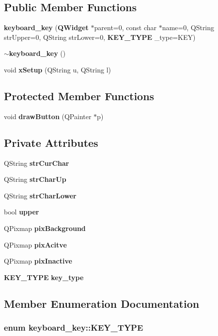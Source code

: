\subsection*{Public Member Functions}
\begin{CompactItemize}
\item 
{\bf keyboard\_\-key} ({\bf QWidget} $\ast$parent=0, const char $\ast$name=0, QString str\-Upper=0, QString str\-Lower=0, {\bf KEY\_\-TYPE} \_\-type=KEY)
\item 
{\bf $\sim$keyboard\_\-key} ()
\item 
void {\bf x\-Setup} (QString u, QString l)
\end{CompactItemize}
\subsection*{Protected Member Functions}
\begin{CompactItemize}
\item 
void {\bf draw\-Button} (QPainter $\ast$p)
\end{CompactItemize}
\subsection*{Private Attributes}
\begin{CompactItemize}
\item 
QString {\bf str\-Cur\-Char}
\item 
QString {\bf str\-Char\-Up}
\item 
QString {\bf str\-Char\-Lower}
\item 
bool {\bf upper}
\item 
QPixmap {\bf pix\-Background}
\item 
QPixmap {\bf pix\-Acitve}
\item 
QPixmap {\bf pix\-Inactive}
\item 
{\bf KEY\_\-TYPE} {\bf key\_\-type}
\end{CompactItemize}


\subsection{Member Enumeration Documentation}
\subsubsection{\setlength{\rightskip}{0pt plus 5cm}enum {\bf keyboard\_\-key::KEY\_\-TYPE}}\label{classkeyboard__key_keyboard__keyw4}


